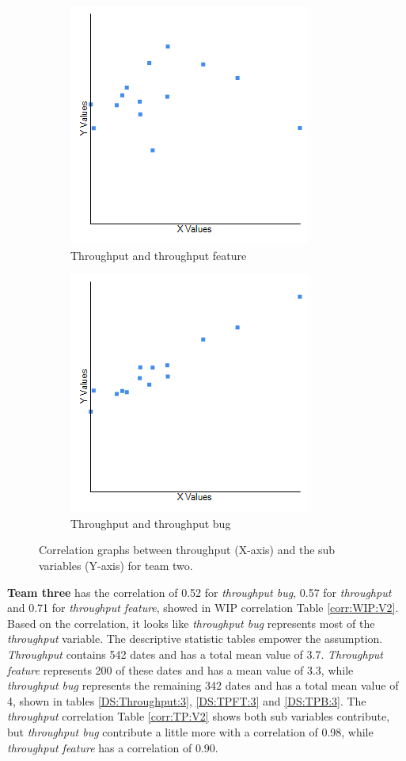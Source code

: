 \documentclass[UKenglish]{ifimaster}  %
\begin{document}
\begin{figure}[h] 
  \begin{subfigure}[b]{0.5\textwidth}
  \center
\includegraphics[scale=0.6]{Picture/Two/TPvsTPFT.png}
 \caption{Throughput and throughput feature} 
 \label{fig:a:2}
  \end{subfigure}
  \begin{subfigure}[b]{0.5\textwidth}
  \center
\includegraphics[scale=0.6]{Picture/Two/TPvsTPB.png}
 \caption{Throughput and throughput bug} 
\label{fig:b:2}
  \end{subfigure}
  \caption{Correlation graphs between throughput (X-axis) and the sub variables (Y-axis) for team two.}
\label{corr:Difference:2}
\end{figure}
\newpage


\textbf{Team three} has the correlation of 0.52 for \textit{throughput bug}, 0.57 for \textit{throughput}  and 0.71 for \textit{throughput feature}, showed in WIP correlation Table \ref{corr:WIP:V2}. Based on the correlation, it looks like \textit{throughput bug} represents most of the \textit{throughput} variable. The descriptive statistic tables empower the assumption. \textit{Throughput} contains 542 dates and has a total mean value of 3.7. \textit{Throughput feature} represents 200 of these dates and has a mean value of 3.3, while \textit{throughput bug} represents the remaining 342 dates and has a total mean value of 4,  shown in tables \ref{DS:Throughput:3}, \ref{DS:TPFT:3} and \ref{DS:TPB:3}. The \textit{throughput} correlation Table \ref{corr:TP:V2} shows both sub variables contribute, but \textit{throughput bug} contribute a little more with a correlation of 0.98, while \textit{throughput feature}  has a correlation of 0.90.
\end{document}
